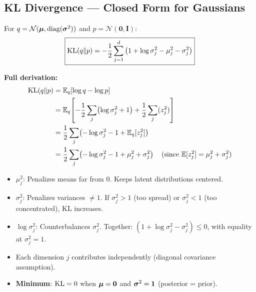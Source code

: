 \subsection{KL Divergence — Closed Form for Gaussians}
For $q = \mathcal{N}(\boldsymbol{\mu}, \text{diag}(\boldsymbol{\sigma}^2))$ and $p = \mathcal{N}(\mathbf{0}, \mathbf{I})$:
\begin{equation}\label{eq:kl_gaussian}
\boxed{\text{KL}(q \| p) = -\frac{1}{2}\sum_{j=1}^{d}\left(1 + \log\sigma_j^2 - \mu_j^2 - \sigma_j^2\right)}
\end{equation}

\textbf{Full derivation:}
\begin{align*}
\text{KL}(q\|p) &= \mathbb{E}_q[\log q - \log p] \\
&= \mathbb{E}_q\!\left[-\frac{1}{2}\sum_j\!\left(\log\sigma_j^2 + 1\right) + \frac{1}{2}\sum_j(z_j^2)\right] \\
&= \frac{1}{2}\sum_j\!\left(-\log\sigma_j^2 - 1 + \mathbb{E}_q[z_j^2]\right) \\
&= \frac{1}{2}\sum_j\!\left(-\log\sigma_j^2 - 1 + \mu_j^2 + \sigma_j^2\right) \quad (\text{since } \mathbb{E}[z_j^2] = \mu_j^2 + \sigma_j^2)
\end{align*}

\begin{keybox}
\begin{itemize}
\item $\mu_j^2$: Penalizes means far from 0. Keeps latent distributions centered.
\item $\sigma_j^2$: Penalizes variances $\neq 1$. If $\sigma_j^2 > 1$ (too spread) or $\sigma_j^2 < 1$ (too concentrated), KL increases.
\item $\log\sigma_j^2$: Counterbalances $\sigma_j^2$. Together: $(1 + \log\sigma_j^2 - \sigma_j^2) \leq 0$, with equality at $\sigma_j^2 = 1$.
\item Each dimension $j$ contributes independently (diagonal covariance assumption).
\item \textbf{Minimum}: $\text{KL} = 0$ when $\boldsymbol{\mu} = \mathbf{0}$ and $\boldsymbol{\sigma}^2 = \mathbf{1}$ (posterior = prior).
\end{itemize}
\end{keybox}

